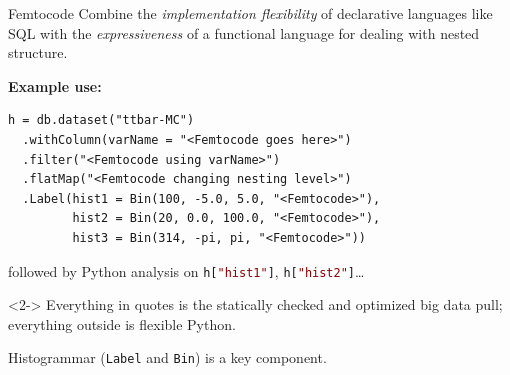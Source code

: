 \documentclass{beamer}
\begin{document}
\begin{frame}[fragile]{Femtocode}
\vspace{0.4 cm}
Combine the {\it implementation flexibility} of declarative languages like SQL with the {\it expressiveness} of a functional language for dealing with nested structure.

\vspace{0.5 cm}
{\bf Example use:}

\small
\begin{verbatim}
h = db.dataset("ttbar-MC")
  .withColumn(varName = "<Femtocode goes here>")
  .filter("<Femtocode using varName>")
  .flatMap("<Femtocode changing nesting level>")
  .Label(hist1 = Bin(100, -5.0, 5.0, "<Femtocode>"),
         hist2 = Bin(20, 0.0, 100.0, "<Femtocode>"),
         hist3 = Bin(314, -pi, pi, "<Femtocode>"))
\end{verbatim}

\normalsize
followed by Python analysis on {\small\tt h[\textcolor{darkred}{"hist1"}]}, {\small\tt h[\textcolor{darkred}{"hist2"}]}\ldots

\vspace{0.1 cm}
\begin{uncoverenv}<2->
Everything in quotes is the statically checked and optimized big data pull; everything outside is flexible Python.

\vspace{0.1 cm}
Histogrammar ({\tt\small Label} and {\tt\small Bin}) is a key component.
\end{uncoverenv}
\end{frame}
\end{document}
